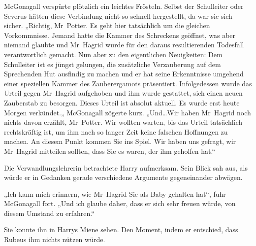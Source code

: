 McGonagall verspürte plötzlich ein leichtes Frösteln. Selbst der Schulleiter oder Severus hätten diese Verbindung nicht so schnell hergestellt, da war sie sich sicher. „Richtig, Mr~Potter. Es geht hier tatsächlich um die gleichen Vorkommnisse. Jemand hatte die Kammer des Schreckens geöffnet, was aber niemand glaubte und Mr~Hagrid wurde für den daraus resultierenden Todesfall verantwortlich gemacht.
Nun aber zu den eigentlichen Neuigkeiten: Dem Schulleiter ist es jüngst gelungen, die zusätzliche Verzauberung auf dem Sprechenden Hut ausfindig zu machen und er hat seine Erkenntnisse umgehend einer speziellen Kammer des Zauberergamots präsentiert. Infolgedessen wurde das Urteil gegen Mr~Hagrid aufgehoben und ihm wurde gestattet, sich einen neuen Zauberstab zu besorgen. Dieses Urteil ist absolut aktuell. Es wurde erst heute Morgen verkündet.„ McGonagall zögerte kurz. „Und…Wir haben Mr~Hagrid noch nichts davon erzählt, Mr~Potter. Wir wollten warten, bis das Urteil tatsächlich rechtskräftig ist, um ihm nach so langer Zeit keine falschen Hoffnungen zu machen. An diesem Punkt kommen Sie ins Spiel. Wir haben uns gefragt, wir Mr~Hagrid mitteilen sollten, dass Sie es waren, der ihm geholfen hat.“

Die Verwandlungslehrerin betrachtete Harry aufmerksam. Sein Blick sah aus, als würde er in Gedanken gerade verschiedene Argumente gegeneinander abwägen.

„Ich kann mich erinnern, wie Mr~Hagrid Sie als Baby gehalten hat“, fuhr McGonagall fort. „Und ich glaube daher, dass er sich sehr freuen würde, von diesem Umstand zu erfahren.“

Sie konnte ihn in Harrys Miene sehen. Den Moment, indem er entschied, dass Rubeus ihm nichts nützen würde.

